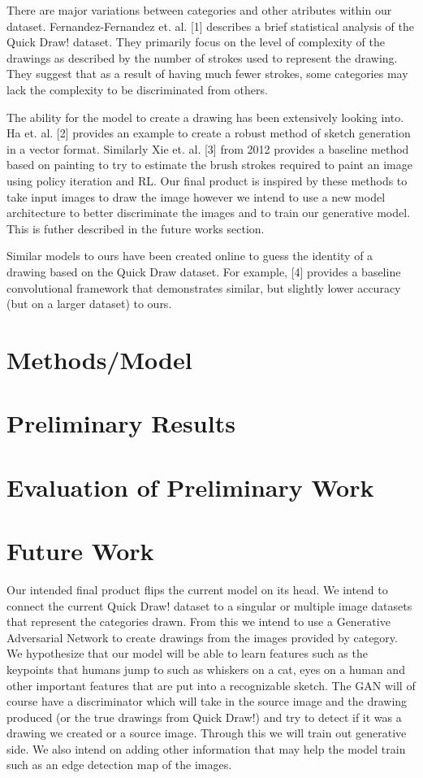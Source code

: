 \documentclass{article}
\begin{document}
There are major variations between categories and other atributes within our
dataset. Fernandez-Fernandez et. al. [1] describes a brief statistical
analysis of the Quick Draw! dataset. They primarily focus on the level of complexity
of the drawings as described by the number of strokes used to represent the
drawing. They suggest that as a result of having much fewer strokes, some
categories may lack the complexity to be discriminated from others.

The ability for the model to create a drawing has been extensively looking into. Ha et. al.
[2] provides an example to create a robust method of sketch generation in a vector
format. Similarly Xie et. al. [3] from 2012 provides a baseline method based
on painting to try to estimate the brush strokes required to paint
an image using policy iteration and RL. Our final product
is inspired by these methods to take input images to draw the image
however we intend to use a new model architecture to better discriminate the images
and to train our generative model. This is futher described in the future
works section.

Similar models to ours have been created online to guess the identity of a drawing
based on the Quick Draw dataset. For example, [4] provides a baseline
convolutional framework that demonstrates similar, but slightly lower accuracy
(but on a larger dataset) to ours.

\section{Methods/Model}


\section{Preliminary Results}


\section{Evaluation of Preliminary Work}


\section{Future Work}

Our intended final product flips the current model on its head. We intend
to connect the current Quick Draw! dataset to a singular or multiple image
datasets that represent the categories drawn. From this we intend to use a
Generative Adversarial Network to create drawings from the images provided by
category. We hypothesize that our model will be able to learn features such
as the keypoints that humans jump to such as whiskers on a cat, eyes on a human
and other important features that are put into a recognizable sketch. The GAN will of course
have a discriminator which will take in the source image and the drawing produced (or the
true drawings from Quick Draw!) and try to detect if it was a drawing we created
or a source image. Through this we will train out generative side. We also
intend on adding other information that may help the model train such as an
edge detection map of the images.
\end{document}
